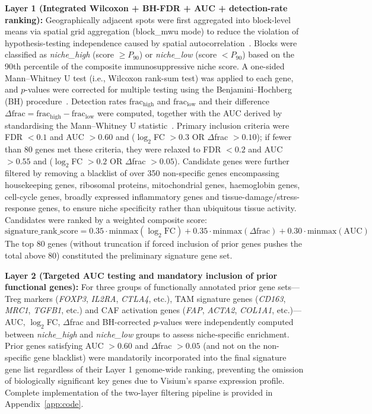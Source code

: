 \documentclass[12pt, a4paper]{article}
\begin{document}
\textbf{Layer 1 (Integrated Wilcoxon + BH-FDR + AUC + detection-rate ranking):}
Geographically adjacent spots were first aggregated into block-level means via spatial grid aggregation (block\_mwu mode) to reduce the violation of hypothesis-testing independence caused by spatial autocorrelation~\citep{palla2022squidpy}. Blocks were classified as \textit{niche\_high} (score $\geq P_{90}$) or \textit{niche\_low} (score $< P_{90}$) based on the 90th percentile of the composite immunosuppressive niche score. A one-sided Mann--Whitney U test (i.e., Wilcoxon rank-sum test) was applied to each gene, and $p$-values were corrected for multiple testing using the Benjamini--Hochberg (BH) procedure~\citep{mann1947test}. Detection rates $\text{frac}_{\text{high}}$ and $\text{frac}_{\text{low}}$ and their difference $\Delta\text{frac} = \text{frac}_{\text{high}} - \text{frac}_{\text{low}}$ were computed, together with the AUC derived by standardising the Mann--Whitney U statistic~\citep{hanley1982meaning}. Primary inclusion criteria were FDR $< 0.1$ and AUC $> 0.60$ and ($\log_2$FC $> 0.3$ OR $\Delta$frac $> 0.10$); if fewer than 80 genes met these criteria, they were relaxed to FDR $< 0.2$ and AUC $> 0.55$ and ($\log_2$FC $> 0.2$ OR $\Delta$frac $> 0.05$). Candidate genes were further filtered by removing a blacklist of over 350 non-specific genes encompassing housekeeping genes, ribosomal proteins, mitochondrial genes, haemoglobin genes, cell-cycle genes, broadly expressed inflammatory genes and tissue-damage/stress-response genes, to ensure niche specificity rather than ubiquitous tissue activity. Candidates were ranked by a weighted composite score:
\begin{equation*}
\text{signature\_rank\_score} = 0.35 \cdot \text{minmax}(\log_2\text{FC}) + 0.35 \cdot \text{minmax}(\Delta\text{frac}) + 0.30 \cdot \text{minmax}(\text{AUC})
\label{eq:signature_rank_score}
\end{equation*}
The top 80 genes (without truncation if forced inclusion of prior genes pushes the total above 80) constituted the preliminary signature gene set.

\textbf{Layer 2 (Targeted AUC testing and mandatory inclusion of prior functional genes):}
For three groups of functionally annotated prior gene sets---Treg markers (\textit{FOXP3}, \textit{IL2RA}, \textit{CTLA4}, etc.), TAM signature genes (\textit{CD163}, \textit{MRC1}, \textit{TGFB1}, etc.) and CAF activation genes (\textit{FAP}, \textit{ACTA2}, \textit{COL1A1}, etc.)---AUC, $\log_2$FC, $\Delta$frac and BH-corrected $p$-values were independently computed between \textit{niche\_high} and \textit{niche\_low} groups to assess niche-specific enrichment. Prior genes satisfying AUC $> 0.60$ and $\Delta$frac $> 0.05$ (and not on the non-specific gene blacklist) were mandatorily incorporated into the final signature gene list regardless of their Layer 1 genome-wide ranking, preventing the omission of biologically significant key genes due to Visium's sparse expression profile. Complete implementation of the two-layer filtering pipeline is provided in Appendix~\ref{app:code}.
\end{document}
